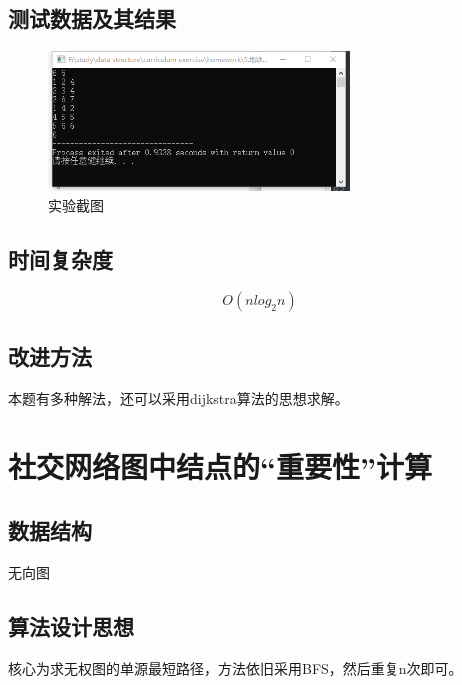 \documentclass[a4paper,11pt,UTF8]{ctexart}
\begin{document}
\subsection{测试数据及其结果}
\begin{figure}[htbp] %
    \centering
    \includegraphics[width=8cm]{7.png}
    \caption{实验截图}
\end{figure}
\subsection{时间复杂度}
$$O(nlog_{2}n)$$
\subsection{改进方法}
本题有多种解法，还可以采用dijkstra算法的思想求解。


\section{社交网络图中结点的“重要性”计算}
\subsection{数据结构}
无向图
\subsection{算法设计思想}
核心为求无权图的单源最短路径，方法依旧采用BFS，然后重复n次即可。
\end{document}
